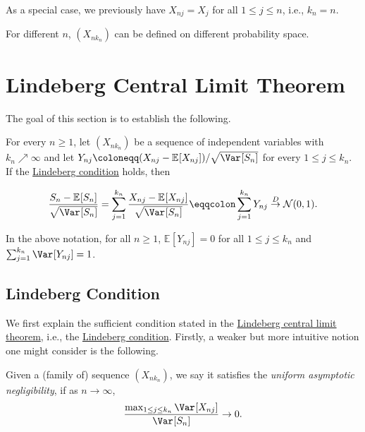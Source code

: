 \begin{eg}
	As a special case, we previously have \(X_{nj} = X_j\) for all \(1 \leq j \leq n\), i.e., \(k_n = n\).
\end{eg}

\begin{remark}
	For different \(n\), \((X_{n k_n})\) can be defined on different probability space.
\end{remark}

\section{Lindeberg Central Limit Theorem}
The goal of this section is to establish the following.

\begin{theorem}\label{thm:Lindeberg-CLT}
	For every \(n \geq 1\), let \((X_{n k_n})\) be a sequence of independent variables with \(k_n \nearrow \infty \) and let \(Y_{nj} \coloneqq (X_{nj} - \mathbb{E}_{}[X_{nj}] ) / \sqrt{\Var_{}[S_n] } \) for every \(1 \leq j \leq k_n\). If the \hyperref[def:Lindeberg-condition]{Lindeberg condition} holds, then

	\[
		\frac{S_n - \mathbb{E}_{}[S_n] }{\sqrt{\Var_{}[S_n] } }
		= \sum_{j=1}^{k_n} \frac{X_{nj} - \mathbb{E}_{}[X_{nj}] }{\sqrt{\Var_{}[S_n] } }
		\eqqcolon \sum_{j=1}^{k_n} Y_{nj}
		\overset{D}{\to} \mathcal{N} (0, 1).
	\]
\end{theorem}

\begin{note}
	In the above notation, for all \(n \geq 1\), \(\mathbb{E}_{}[Y_{nj}] = 0\) for all \(1 \leq j \leq k_n\) and \(\sum_{j=1}^{k_n} \Var_{}[Y_{nj}] = 1\).
\end{note}

\subsection{Lindeberg Condition}
We first explain the sufficient condition stated in the \hyperref[thm:Lindeberg-CLT]{Lindeberg central limit theorem}, i.e., the \hyperref[def:Lindeberg-condition]{Lindeberg condition}. Firstly, a weaker but more intuitive notion one might consider is the following.

\begin{definition}\label{def:uniform-asymptotic-negligibility}
	Given a (family of) sequence \((X_{n k_n})\), we say it satisfies the \emph{uniform asymptotic negligibility}, if as \(n \to \infty \),
	\[
		\frac{\max _{1 \leq j \leq k_n} \Var_{}[X_{nj}] }{\Var_{}[S_n] } \to 0.
	\]
\end{definition}

